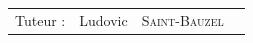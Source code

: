 \begin{titlepage}

\begin{table}[h!]
	\begin{center}
	\large
    	\begin{tabular}{l c c c}
        Tuteur : & Ludovic & \textsc{Saint-Bauzel} \\ 
    	\end{tabular}
	\end{center}

\end{table}

\end{titlepage}
